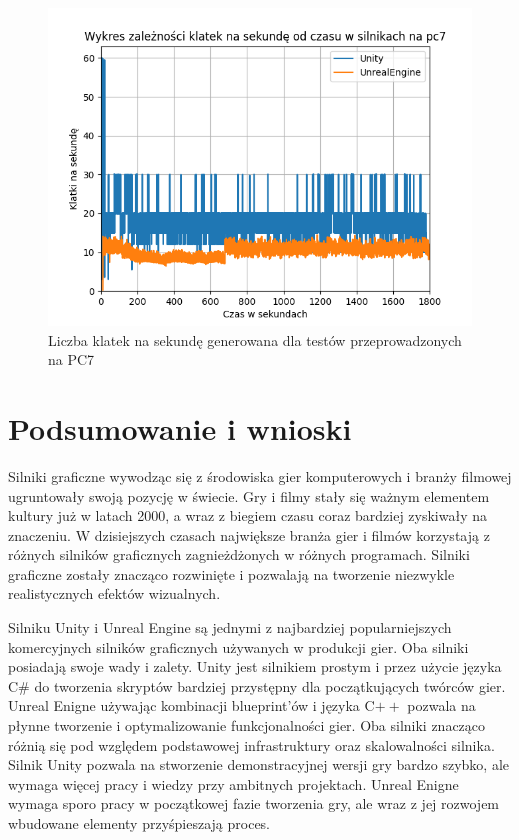 \documentclass[12pt,twoside]{article}
\begin{document}
\begin{figure}[ht]
    \centering
    \includegraphics[width=16cm]{figures/FPSPlots/pc7searchedDataName.png}
    \caption{Liczba klatek na sekundę generowana dla testów przeprowadzonych na PC7}
    \label{Fig:PC7Tests}
\end{figure}    





\clearpage


\section{Podsumowanie i wnioski}

Silniki graficzne wywodząc się z środowiska gier komputerowych i branży filmowej
ugruntowały swoją pozycję w świecie. Gry i filmy stały się ważnym elementem
kultury już w latach 2000, a wraz z biegiem czasu coraz bardziej zyskiwały na
znaczeniu.  W dzisiejszych czasach największe branża gier i filmów korzystają z
różnych silników graficznych zagnieżdżonych w różnych programach. Silniki
graficzne zostały znacząco rozwinięte i pozwalają na tworzenie niezwykle
realistycznych efektów wizualnych.

Silniku Unity i Unreal Engine są jednymi z najbardziej popularniejszych
komercyjnych silników graficznych używanych w produkcji gier. Oba silniki
posiadają swoje wady i zalety. Unity jest silnikiem prostym i przez użycie
języka C\# do tworzenia skryptów bardziej przystępny dla początkujących twórców
gier. Unreal Enigne używając kombinacji blueprint’ów i języka C$++$ pozwala na
płynne tworzenie i optymalizowanie funkcjonalności gier. Oba silniki znacząco
różnią się pod względem podstawowej infrastruktury oraz skalowalności silnika.
Silnik Unity pozwala na stworzenie demonstracyjnej wersji gry bardzo szybko, ale
wymaga więcej pracy i wiedzy przy ambitnych projektach. Unreal Enigne wymaga
sporo pracy w początkowej fazie tworzenia gry, ale wraz z jej rozwojem wbudowane
elementy przyśpieszają proces. 
\end{document}
